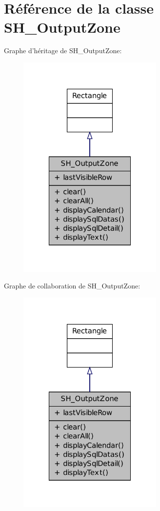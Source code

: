 \hypertarget{classSH__OutputZone}{\section{Référence de la classe S\-H\-\_\-\-Output\-Zone}
\label{classSH__OutputZone}
}


Graphe d'héritage de S\-H\-\_\-\-Output\-Zone\-:
\nopagebreak
\begin{figure}[H]
\begin{center}
\leavevmode
\includegraphics[width=204pt]{classSH__OutputZone__inherit__graph}
\end{center}
\end{figure}


Graphe de collaboration de S\-H\-\_\-\-Output\-Zone\-:
\nopagebreak
\begin{figure}[H]
\begin{center}
\leavevmode
\includegraphics[width=204pt]{classSH__OutputZone__coll__graph}
\end{center}
\end{figure}
